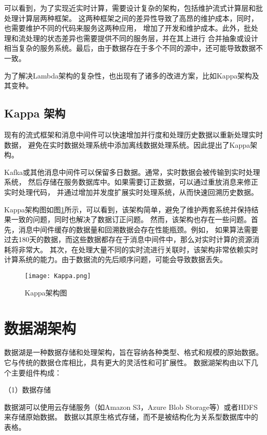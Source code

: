可以看到，为了实现近实时计算，需要设计复杂的架构，包括维护流式计算层和批处理计算层两种框架。
这两种框架之间的差异性导致了高昂的维护成本，同时，也需要维护不同的代码来服务这两种应用，
增加了开发和维护成本。此外，批处理和流处理的状态差异也需要提供不同的服务层，并在其上进行
合并抽象或设计相当复杂的服务系统。最后，由于数据存在于多个不同的源中，还可能导致数据不一致。

为了解决Lambda架构的复杂性，也出现有了诸多的改进方案，比如Kappa架构及其变种。

\subsection{Kappa 架构}

现有的流式框架和消息中间件可以快速增加并行度和处理历史数据以重新处理实时数据，
避免在实时数据处理系统中添加离线数据处理系统。因此提出了Kappa架构\cite{4}。

Kafka或其他消息中间件可以保留多日数据。通常，实时数据会被传输到实时处理系统，
然后存储在服务数据库中。如果需要订正数据，可以通过重放消息来修正实时处理代码，
并通过增加并发度扩展实时处理系统，从而快速回溯历史数据。

Kappa架构图如图\ref{fig:Kappa架构图}所示，可以看到，该架构简单，避免了维护两套系统并保持结果一致的问题，同时也解决了数据订正问题。
然而，该架构也存在一些问题。首先，消息中间件缓存的数据量和回溯数据会存在性能瓶颈。例如，
如果算法需要过去180天的数据，而这些数据都存在于消息中间件中，那么对实时计算的资源消耗将非常大。
其次，在处理大量不同的实时流进行关联时，该架构非常依赖实时计算系统的能力。由于数据流的先后顺序问题，可能会导致数据丢失。

\begin{figure}[H]
  \centering
  \texttt{[image: Kappa.png]}
  \caption{Kappa架构图}
  \label{fig:Kappa架构图}
\end{figure}

\section{数据湖架构}

数据湖是一种数据存储和处理架构，旨在容纳各种类型、格式和规模的原始数据\cite{12,14}。它与传统的数据仓库相比，具有更大的灵活性和可扩展性\cite{28,29}。
数据湖架构由以下几个主要组件构成：

（1）数据存储

数据湖可以使用云存储服务（如Amazon S3，Azure Blob Storage等）或者HDFS来存储原始数据。
数据以其原生格式存储，而不是被结构化为关系型数据库中的表格。

